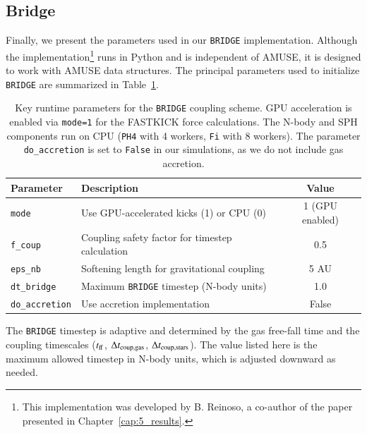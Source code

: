 \subsection{Bridge}

Finally, we present the parameters used in our \texttt{BRIDGE} implementation. Although the implementation\footnote{This implementation was developed by B. Reinoso, a co-author of the paper presented in Chapter~\ref{cap:5_results}.} runs in Python and is independent of AMUSE, it is designed to work with AMUSE data structures. The principal parameters used to initialize \texttt{BRIDGE} are summarized in Table~\ref{tab:bridge_parameters}.

\begin{table}[!ht]
	\centering
	\begin{threeparttable}
		\begin{tabular}{l p{5.5cm} c}
			\hline
			\rowcolor[gray]{0.8}
			\textbf{Parameter} & \textbf{Description} & \textbf{Value} \\
			\hline
			\texttt{mode} & Use GPU-accelerated kicks (1) or CPU (0) & 1 (GPU enabled) \\
			\texttt{f\_coup} & Coupling safety factor for timestep calculation & 0.5 \\
			\texttt{eps\_nb} & Softening length for gravitational coupling & 5 AU \\
			\texttt{dt\_bridge} & Maximum \texttt{BRIDGE} timestep (N-body units)\tnote{1} & 1.0 \\
			\texttt{do\_accretion} & Use accretion implementation & False \\
			\hline
		\end{tabular}
		\begin{tablenotes}
			\item[1] The \texttt{BRIDGE} timestep is adaptive and determined by the gas free-fall time and the coupling timescales ($t_{\rm ff}$, $\Delta t_{\rm coup,gas}$, $\Delta t_{\rm coup,stars}$). The value listed here is the maximum allowed timestep in N-body units, which is adjusted downward as needed.
		\end{tablenotes}
	\end{threeparttable}
	\caption{Key runtime parameters for the \texttt{BRIDGE} coupling scheme. GPU acceleration is enabled via \texttt{mode=1} for the FASTKICK force calculations. The N-body and SPH components run on CPU (\texttt{PH4} with 4 workers, \texttt{Fi} with 8 workers). The parameter \texttt{do\_accretion} is set to \texttt{False} in our simulations, as we do not include gas accretion.}
	\label{tab:bridge_parameters}
\end{table}

